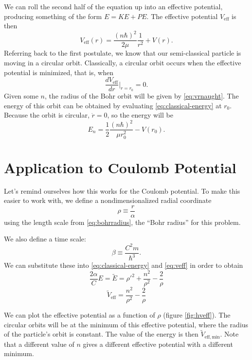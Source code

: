 \documentclass[12pt,twoside]{reedthesis}
\newcommand{\eqn}[1]{\begin{equation}#1\end{equation}}
\begin{document}
We can roll the second half of the equation up into an effective potential, producing something of the form $E = KE + PE$. The effective potential $V_{\mathrm{eff}}$ is then
\eqn{
V_{\mathrm{eff}}(r)=\frac{(n \hbar)^2}{2 \mu}\frac{1}{r^2}+V(r)\mbox{.}
\label{eq:veff}
}
Referring back to the first postulate, we know that our semi-classical particle is moving in a circular orbit. Classically, a circular orbit occurs when the effective potential is minimized, that is, when
\eqn{
\frac{dV_{\mathrm{eff}}}{d r}\Big |_{r = r_0}= 0\mbox{.}
\label{eq:vrnaught}
}
Given some $n$, the radius of the Bohr orbit will be given by \eqref{eq:vrnaught}. The energy of this orbit can be obtained by evaluating \eqref{eq:classical-energy}
 at $r_0$. Because the orbit is circular, $\dot{r} = 0$, so the energy will be 
\eqn{
E_{n} = \frac{1}{2}\frac{(n\hbar)^2}{\mu r_0^2} - V(r_0)\mbox{.}
}

\section{Application to Coulomb Potential}
Let's remind ourselves how this works for the Coulomb potential. To make this easier to work with, we define a nondimensionalized radial coordinate
\begin{equation}
\rho \equiv \frac{r}{\alpha}
\label{eq:rho}
\end{equation}
using the length scale from \eqref{eq:bohrradius}, the ``Bohr radius'' for this problem.

We also define a time scale:
\begin{equation}
\beta \equiv \frac{C^2m}{\hbar^3}\mbox{.}
\label{eq:beta}
\end{equation}
We can substitute these into \eqref{eq:classical-energy} and \eqref{eq:veff} in order to obtain 
\eqn{
\frac{2 \alpha}{C}E = \tilde{E}= \rho '^2 + \frac{n^2}{\rho^2}-\frac{2}{\rho}
\label{eq:energy-nondim}
}
\eqn{
\tilde{V}_{\mathrm{eff}} = \frac{n^2}{\rho^2}-\frac{2}{\rho}
\label{eq:veff-nondim}
}

We can plot the effective potential as a function of $\rho$ (figure \ref{fig:hveff}). The circular orbits will be at the minimum of this effective potential, where the radius of the particle's orbit is constant. The value of the energy is then $\tilde{V}_{\mathrm{eff,min}}$. Note that a different value of $n$ gives a different effective potential with a different minimum. 
\end{document}
